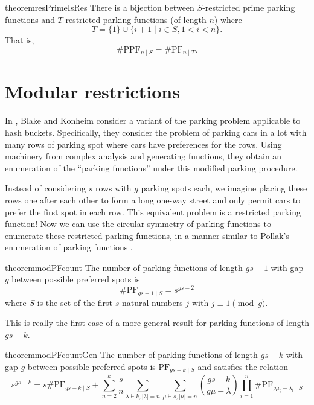 \documentclass[12 pt]{amsart}
\theoremstyle{definition} %
\theoremstyle{remark} %
\begin{document}
\begin{restatable}{theorem}{resPrimeIsRes}
	There is a bijection between $S$-restricted prime parking functions and $T$-restricted parking functions (of length $n$) where
	\[
		T = \{ 1 \} \cup \{ i + 1 \mid i \in S, 1 < i < n \}.
	\]
	That is,
	\[
		\# \mathrm{PPF}_{n \mid S} = \# \mathrm{PF}_{n \mid T}.
	\]
\end{restatable}

\section{Modular restrictions}

In \cite{blake-konheim-1977}, Blake and Konheim consider a variant of the parking problem applicable to hash buckets.  Specifically, they consider the problem of parking cars in a lot with many rows of parking spot where cars have preferences for the rows. Using machinery from complex analysis and generating functions, they obtain an enumeration of the ``parking functions'' under this modified parking procedure. 

Instead of considering $s$ rows with $g$ parking spots each,  we imagine placing these rows one after each other to form a long one-way street and only permit cars to prefer the first spot in each row. This equivalent problem is a restricted parking function! Now we can use the circular symmetry of parking functions to enumerate these restricted parking functions, in a manner similar to Pollak's enumeration of parking functions . 

\begin{restatable}{theorem}{modPFcount}
	\label{thm:modPFcount}
	The number of parking functions of length $gs - 1$ with gap $g$ between possible preferred spots is
	\[
		\# \mathrm{PF}_{gs - 1 \mid S} = s^{gs - 2}
	\]
	where $S$ is the set of the first $s$ natural numbers $j$ with $j \equiv 1 \pmod g$.
\end{restatable}

This is really the first case of a more general result for parking functions of length $gs - k$.

\begin{restatable}{theorem}{modPFcountGen}
	The number of parking functions of length $gs - k$ with gap $g$ between possible preferred spots is $\mathrm{PF}_{gs - k \mid S}$ and satisfies the relation
	\[
		s^{gs - k} = s \# \mathrm{PF}_{gs - k \mid S} + \sum_{n = 2}^{k} \frac{s}{n} \sum_{\lambda \vdash k, \lvert \lambda \rvert = n} \sum_{\mu \vdash s, \lvert \mu \rvert = n} \binom{gs - k}{g \mu - \lambda} \prod_{i = 1}^{n} \# \mathrm{PF}_{g \mu_{i} - \lambda_{i} \mid S}
	\]
\end{restatable} 
\end{document}
